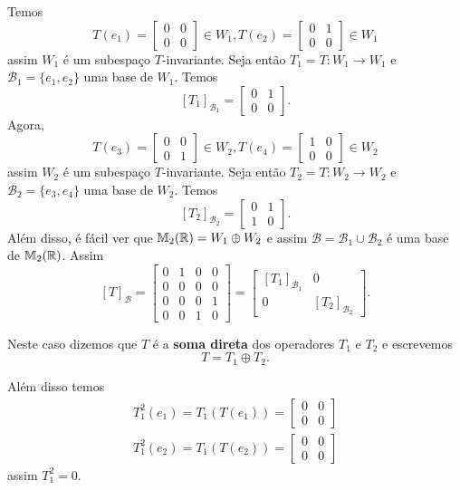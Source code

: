 Temos
\[
	T(e_1) = \begin{bmatrix}
		0 & 0\\
		0 & 0
	\end{bmatrix} \in W_1,
	T(e_2) = \begin{bmatrix}
		0 & 1\\
		0 & 0
	\end{bmatrix} \in W_1
\]
assim $W_1$ \'e um subespa\c{c}o $T$-invariante. Seja ent\~ao $T_1 = T : W_1 \to W_1$ e $\mathcal{B}_1 = \{e_1, e_2\}$ uma base de $W_1$. Temos
\[
	[T_1]_{\mathcal{B}_1} = \begin{bmatrix}
		0 & 1\\
		0 & 0
	\end{bmatrix}.
\]
Agora,
\[
	T(e_3) = \begin{bmatrix}
		0 & 0\\
		0 & 1
	\end{bmatrix} \in W_2,
	T(e_4) = \begin{bmatrix}
		1 & 0\\
		0 & 0
	\end{bmatrix} \in W_2
\]
assim $W_2$ \'e um subespa\c{c}o $T$-invariante. Seja ent\~ao $T_2 = T : W_2 \to W_2$ e $\mathcal{B}_2 = \{e_3, e_4\}$ uma base de $W_2$. Temos
\[
	[T_2]_{\mathcal{B}_2} = \begin{bmatrix}
		0 & 1\\
		1 & 0
	\end{bmatrix}.
\]
Al\'em disso, \'e f\'acil ver que $\mathbb{M}_2(\mathbb{R}) = W_1 \oplus W_2$ e assim $\mathcal{B} = \mathcal{B}_1 \cup \mathcal{B}_2$ \'e uma base de $\mathbb{M}_2(\mathbb{R})$. Assim
\[
	[T]_\mathcal{B} = \begin{bmatrix}
		0 & 1 & 0 & 0\\
		0 & 0 & 0 & 0\\
		0 & 0 & 0 & 1\\
		0 & 0 & 1 & 0
	\end{bmatrix} = \begin{bmatrix}
		[T_1]_{\mathcal{B}_1} & 0\\
		0 & [T_2]_{\mathcal{B}_2}
	\end{bmatrix}.
\]

Neste caso dizemos que $T$ \'e a \textbf{soma direta} dos operadores $T_1$ e $T_2$ e escrevemos
\[
	T = T_1 \oplus T_2.
\]

Al\'em disso temos
\begin{align*}
	T_1^2 (e_1) = T_1(T(e_1)) = \begin{bmatrix}
		0 & 0\\
		0 & 0
	\end{bmatrix}\\
	T_1^2 (e_2) = T_1(T(e_2)) = \begin{bmatrix}
		0 & 0\\
		0 & 0
	\end{bmatrix}
\end{align*}
assim $T_1^2 = 0$.


